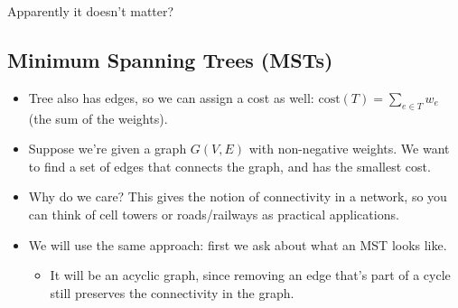 \documentclass[10pt]{article}
\newcommand{\cost}{\mathrm{cost}}
\newcommand{\answer}[1]{\textcolor{green!80!black!}{#1}}
\begin{document}
	\answer{Apparently it doesn't matter?} 
	\subsection{Minimum Spanning Trees (MSTs)}
	\begin{itemize}
		\item Tree also has edges, so we can assign a cost as well: $\cost(T) = \sum_{e \in T} w_e$ (the 
			sum of the weights).
		\item Suppose we're given a graph $G(V, E)$ with non-negative weights. We want to find a set of edges
			that connects the graph, and has the smallest cost. 
		\item Why do we care? This gives the notion of connectivity in a network, so you can think of cell 
			towers or roads/railways as practical applications.
		\item We will use the same approach: first we ask about what an MST looks like.
			\begin{itemize}
				\item It will be an acyclic graph, since removing an edge that's part of a cycle still preserves
					the connectivity in the graph.
			\end{itemize}
	\end{itemize}
\end{document}
